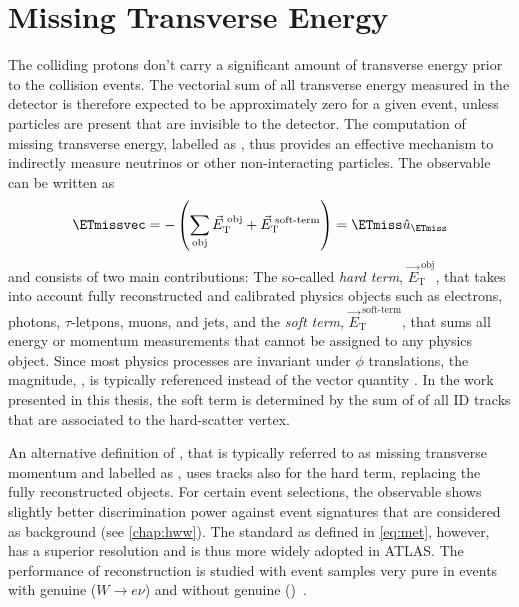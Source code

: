 \section{Missing Transverse Energy}
The colliding protons don't carry a significant amount of transverse energy prior to the collision events.
The vectorial sum of all transverse energy measured in the detector is therefore expected to be approximately zero for a given event, unless particles are present that are invisible to the detector. The computation of missing transverse energy, labelled as \ETmissvec, thus provides an effective mechanism to indirectly measure neutrinos or other non-interacting particles.
The \ETmissvec observable can be written as
\begin{equation}
    \ETmissvec = - \left( \sum_{\text{obj}} \vec{E}_{\text{T}}^\text{ obj} + \vec{E}_{\text{T}}^\text{ soft-term} \right)
    = \ETmiss \hat{u}_{\ETmiss}
    \label{eq:met}
\end{equation}
and consists of two main contributions: The so-called \emph{hard term}, $\vec{E}_{\text{T}}^\text{ obj}$, that takes into account fully reconstructed and calibrated physics objects such as electrons, photons, $\tau$-letpons, muons, and jets, and the \emph{soft term}, $\vec{E}_{\text{T}}^\text{ soft-term}$, that sums all energy or momentum measurements that cannot be assigned to any physics object.
Since most physics processes are invariant under $\phi$ translations, the magnitude, \ETmiss, is typically referenced instead of the vector quantity \ETmissvec.
In the work presented in this thesis, the soft term is determined by the sum of \pT of all ID tracks that are associated to the hard-scatter vertex.

An alternative definition of \ETmiss, that is typically referred to as missing transverse momentum and labelled as \pTmiss, uses tracks also for the hard term, replacing the fully reconstructed objects.
For certain event selections, the \pTmiss observable shows slightly better discrimination power against event signatures that are considered as background (see \cref{chap:hww}). The standard \ETmiss as defined in \cref{eq:met}, however, has a superior resolution and is thus more widely adopted in ATLAS.
The performance of \ETmiss reconstruction is studied with event samples very pure in events with genuine \ETmiss ($W \rightarrow e\nu$) and without genuine \ETmiss (\Zmumu)~\cite{PERF-2016-07}.

